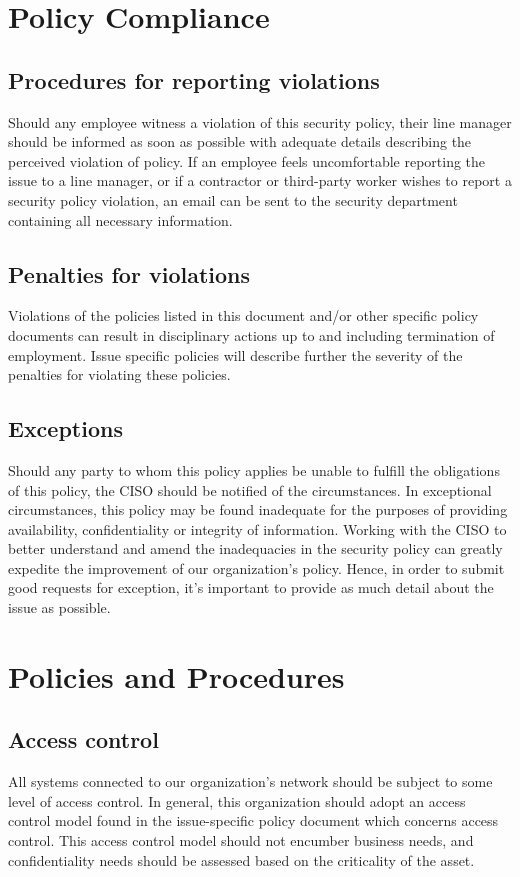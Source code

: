 \documentclass[11pt]{article}
\begin{document}
\section{Policy Compliance}
\label{sec:org273fedf}
\subsection{Procedures for reporting violations}
\label{sec:orge3b154b}
Should any employee witness a violation of this security policy, their line manager should be informed as soon as possible with adequate details describing the perceived violation of policy. If an employee feels uncomfortable reporting the issue to a line manager, or if a contractor or third-party worker wishes to report a security policy violation, an email can be sent to the security department containing all necessary information.

\subsection{Penalties for violations}
\label{sec:org4fafd19}
Violations of the policies listed in this document and/or other specific policy documents can result in disciplinary actions up to and including termination of employment. Issue specific policies will describe further the severity of the penalties for violating these policies.

\subsection{Exceptions}
\label{sec:orgdb69fb3}
Should any party to whom this policy applies be unable to fulfill the obligations of this policy, the CISO should be notified of the circumstances. In exceptional circumstances, this policy may be found inadequate for the purposes of providing availability, confidentiality or integrity of information. Working with the CISO to better understand and amend the inadequacies in the security policy can greatly expedite the improvement of our organization's policy. Hence, in order to submit good requests for exception, it's important to provide as much detail about the issue as possible.

\section{Policies and Procedures}
\label{sec:orgf215ef3}
\subsection{Access control}
\label{sec:orgabcc4ea}
All systems connected to our organization's network should be subject to some level of access control. In general, this organization should adopt an access control model found in the issue-specific policy document which concerns access control. This access control model should not encumber business needs, and confidentiality needs should be assessed based on the criticality of the asset.
\end{document}

